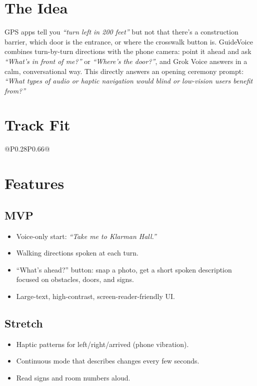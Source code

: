 \documentclass[11pt]{article}
\begin{document}

\section{The Idea}
GPS apps tell you \emph{``turn left in 200 feet''} but not that there's a
construction barrier, which door is the entrance, or where the crosswalk button
is. GuideVoice combines turn-by-turn directions with the phone camera: point it
ahead and ask \emph{``What's in front of me?''} or \emph{``Where's the door?''}, and
Grok Voice answers in a calm, conversational way. This directly answers an opening
ceremony prompt: \emph{``What types of audio or haptic navigation would blind or
low-vision users benefit from?''}

\section{Track Fit}
\begin{tabular}{@{}P{0.28\textwidth}P{0.66\textwidth}@{}}
\toprule
{}
\bottomrule
\end{tabular}

\section{Features}
\subsection{MVP}
\begin{itemize}
  \item Voice-only start: \emph{``Take me to Klarman Hall.''}
  \item Walking directions spoken at each turn.
  \item ``What's ahead?'' button: snap a photo, get a short spoken description focused on obstacles, doors, and signs.
  \item Large-text, high-contrast, screen-reader-friendly UI.
\end{itemize}
\subsection{Stretch}
\begin{itemize}
  \item Haptic patterns for left/right/arrived (phone vibration).
  \item Continuous mode that describes changes every few seconds.
  \item Read signs and room numbers aloud.
\end{itemize}
\end{document}

